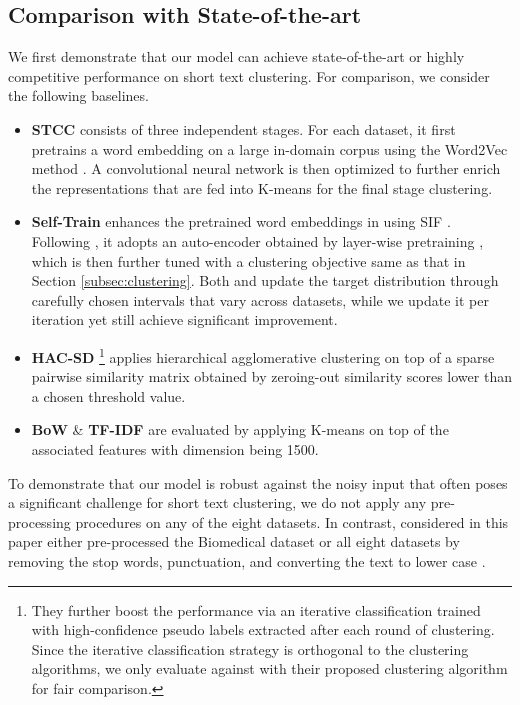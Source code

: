 \documentclass[11pt]{article}
\newcommand{\modify}[1]{{\color{black}{#1}}}
\begin{document}
\subsection{Comparison with State-of-the-art}
We first demonstrate that our model can achieve state-of-the-art or highly competitive performance on short text clustering. For comparison, we consider the following baselines. 
\begin{itemize}
    \item \textbf{STCC} \citep{xu2017self} consists of three independent stages. For each dataset, it first pretrains a word embedding on a large in-domain corpus using the Word2Vec method \citep{mikolov2013efficient}. A convolutional neural network is then optimized to further enrich the representations that are fed into K-means for the final stage clustering. 
    \item\textbf{Self-Train} \citep{hadifar2019self} enhances the pretrained word embeddings in \citet{xu2017self} using SIF \citep{arora2016simple}. Following \citet{xie2016unsupervised}, it adopts an auto-encoder obtained by layer-wise pretraining  \citep{van2009learning}, which is then further tuned with a clustering objective same as that in Section \ref{subsec:clustering}. Both \citet{xie2016unsupervised} and \citet{hadifar2019self} update the target distribution through carefully chosen intervals that vary across datasets, while we update it per iteration yet still achieve significant improvement. 
    \item\textbf{HAC-SD} \citep{rakib2020enhancement}\footnote{They further boost the performance via an iterative classification trained with high-confidence pseudo labels extracted after each round of clustering. Since the iterative classification strategy is orthogonal to the clustering algorithms, we only evaluate against with their proposed clustering algorithm for fair comparison.} applies hierarchical agglomerative clustering on top of a sparse pairwise similarity matrix obtained by zeroing-out similarity scores lower than a chosen threshold value. 
  \item \textbf{BoW} \& \textbf{TF-IDF} are evaluated by applying K-means on top of the associated features with dimension being 1500. 
\end{itemize}

To demonstrate that our model is robust against the noisy input that often poses a significant challenge for short text clustering, we do not apply any pre-processing procedures on any of the eight datasets. 
In contrast, 
\modify{all baselines except BoW and TF-IDF}
considered in this paper either pre-processed the Biomedical dataset \citep{xu2017self, hadifar2019self} or all eight datasets by removing the stop words, punctuation, and converting the text to lower case \citep{rakib2020enhancement}.
\end{document}
